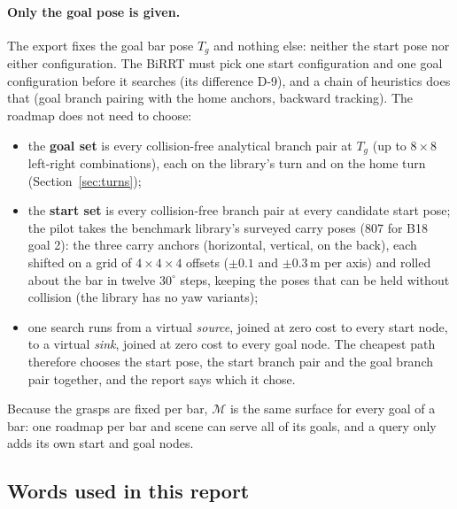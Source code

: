 \documentclass[11pt,a4paper]{article}
\begin{document}
\paragraph{Only the goal pose is given.}
The export fixes the goal bar pose $T_g$ and nothing else: neither the start
pose nor either configuration. The BiRRT must pick one start configuration and
one goal configuration before it searches (its difference D-9), and a chain of
heuristics does that (goal branch pairing with the home anchors, backward
tracking). The roadmap does not need to choose:
\begin{itemize}[nosep]
  \item the \textbf{goal set} is every collision-free analytical branch pair at
        $T_g$ (up to $8 \times 8$ left-right combinations), each on the
        library's turn and on the home turn (Section~\ref{sec:turns});
  \item the \textbf{start set} is every collision-free branch pair at every
        candidate start pose; the pilot takes the benchmark library's surveyed
        carry poses (807 for B18 goal 2): the three carry anchors
        (horizontal, vertical, on the back), each shifted on a grid of
        $4 \times 4 \times 4$ offsets ($\pm 0.1$ and $\pm 0.3$\,m per axis)
        and rolled about the bar in twelve $30^\circ$ steps, keeping the poses
        that can be held without collision (the library has no yaw variants);
  \item one search runs from a virtual \emph{source}, joined at zero cost to
        every start node, to a virtual \emph{sink}, joined at zero cost to
        every goal node. The cheapest path therefore chooses the start pose,
        the start branch pair and the goal branch pair together, and the report
        says which it chose.
\end{itemize}
Because the grasps are fixed per bar, $\mathcal{M}$ is the same surface for
every goal of a bar: one roadmap per bar and scene can serve all of its goals,
and a query only adds its own start and goal nodes.

\subsection*{Words used in this report}
\label{sec:words}
\end{document}
